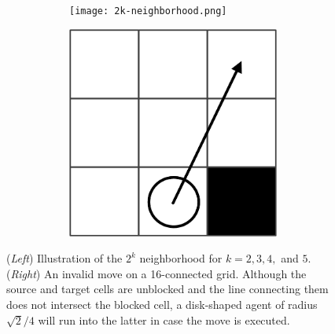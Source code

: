 \documentclass[review]{elsarticle}
\begin{document}
\begin{figure}[t]
\centering
\begin{subfigure}
    \centering
    \begin{subfigure}
        \centering
        \texttt{[image: 2k-neighborhood.png]}
    \end{subfigure}\hspace{0.025\linewidth}%
    \begin{subfigure}
        \centering
        \includegraphics[width=0.25\linewidth]{MAPFr-invalid-move-on-a-grid.png}
    \end{subfigure}%
\end{subfigure}

\caption{(\emph{Left}) Illustration of the $2^k$ neighborhood for $k=2,3,4,$ and $5$. (\emph{Right}) An invalid move on a 16-connected grid. Although the source and target cells are unblocked and the line connecting them does not intersect the blocked cell, a disk-shaped agent of radius $\sqrt{2}/{4}$ will run into the latter in case the move is executed.}
\label{fig:2k-grids-and-invalid-move}
\end{figure}


\end{document}
